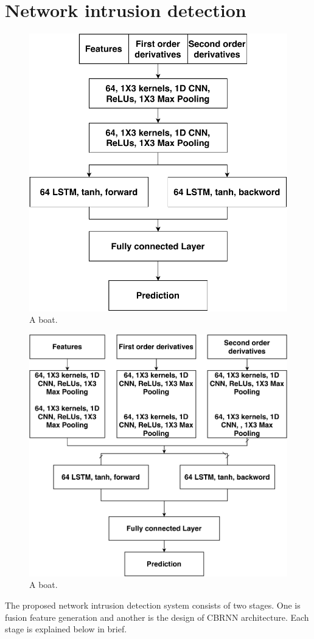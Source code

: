 \documentclass[review]{elsarticle}
\begin{document}
\section{Network intrusion detection}
\begin{figure}
	\includegraphics[width=\linewidth]{jagp2.pdf}
	\caption{A boat.}
	\label{fig1}
\end{figure}
\begin{figure}
	\includegraphics[width=\linewidth]{jagp.pdf}
	\caption{A boat.}
	\label{fig2}
\end{figure}
The proposed network intrusion detection system consists of two stages. One is fusion feature generation and another is the design of CBRNN architecture. Each stage is explained below in brief.
\end{document}
